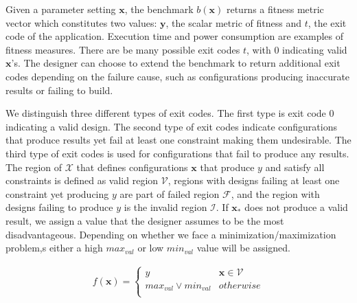 \documentclass[10pt,conference,a4paper]{IEEEtran}
\begin{document}
Given a parameter setting $\mathbf{x}$, the benchmark $b(\mathbf{x})$ returns a fitness metric vector which constitutes two values: $\textbf{y}$, the scalar metric of fitness and $t$, the exit code of the application. Execution time and power consumption are examples of fitness measures. There are be many possible exit codes $t$, with 0 indicating valid $\mathbf{x}$'s. The designer can choose to extend the benchmark to return additional exit codes depending on the failure cause, such as configurations producing inaccurate results or failing to build. 

We distinguish three different types of exit codes. The first type is exit code 0 indicating a valid design. The second type of exit codes indicate configurations that produce results yet fail at least one constraint making them undesirable. The third type of exit codes is used for configurations that fail to produce any results. The region of $\mathcal{X}$ that defines configurations $\mathbf{x}$ that produce $y$ and satisfy all constraints is defined as valid region $\mathcal{V}$, regions with designs failing at least one constraint yet producing $y$ are part of failed region $\mathcal{F}$, and the region with designs failing to produce $y$ is the invalid region $\mathcal{I}$. If $\mathbf{x_*}$ does not produce a valid result, we assign a value that the designer assumes to be the most disadvantageous. Depending on whether we face a minimization/maximization problem,s either a high $max_{val}$ or low $min_{val}$ value will be assigned.


\begin{align} 
\label{eq:fitnessdef}
f(\mathbf{x}) =
\begin{cases}
y & \mathbf{x} \in \mathcal{V}  \\
max_{val} \vee min_{val}& otherwise  \\
\end{cases}
\end{align} 

\end{document}
